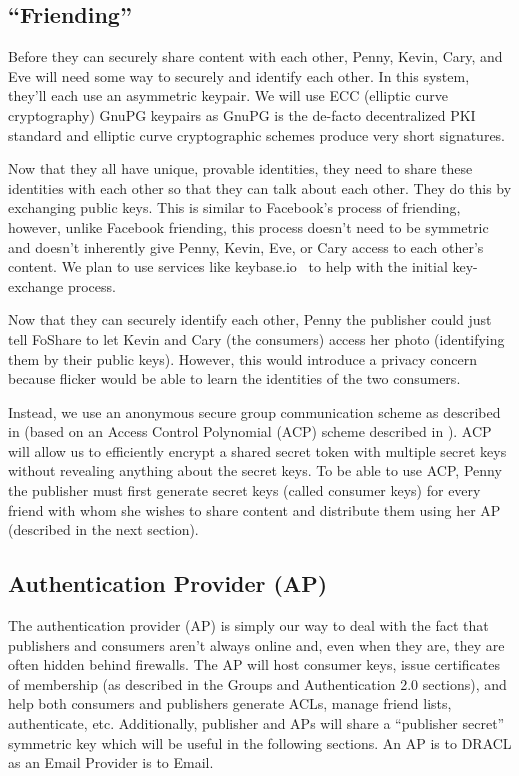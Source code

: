\documentclass[pdftex,12pt,a4papaer]{article}
\begin{document}
\subsection{``Friending''}

Before they can securely share content with each other, Penny, Kevin, Cary, and
Eve will need some way to securely and identify each other. In this system,
they'll each use an asymmetric keypair. We will use ECC (elliptic curve
cryptography) GnuPG keypairs as GnuPG is the de-facto decentralized PKI standard
and elliptic curve cryptographic schemes produce very short signatures.

Now that they all have unique, provable identities, they need to share these
identities with each other so that they can talk about each other. They do this
by exchanging public keys. This is similar to Facebook's process of friending,
however, unlike Facebook friending, this process doesn't need to be symmetric
and doesn't inherently give Penny, Kevin, Eve, or Cary access to each other's
content.  We plan to use services like keybase.io~\cite{keybase} to help with
the initial key-exchange process.

Now that they can securely identify each other, Penny the publisher could just
tell FoShare to let Kevin and Cary (the consumers) access her photo
(identifying them by their public keys). However, this would introduce a privacy
concern because flicker would be able to learn the identities of the two
consumers.

Instead, we use an anonymous secure group communication scheme as described in
\cite{acp2} (based on an Access Control Polynomial (ACP) scheme described in
\cite{acp}). ACP will allow us to efficiently encrypt a shared secret token with
multiple secret keys without revealing anything about the secret keys. To be
able to use ACP, Penny the publisher must first generate secret keys (called
consumer keys) for every friend with whom she wishes to share content and
distribute them using her AP (described in the next section).

\subsection{Authentication Provider (AP)}

The authentication provider (AP) is simply our way to deal with the fact that
publishers and consumers aren't always online and, even when they are, they are
often hidden behind firewalls. The AP will host consumer keys, issue
certificates of membership (as described in the Groups and Authentication 2.0
sections), and help both consumers and publishers generate ACLs, manage friend
lists, authenticate, etc. Additionally, publisher and APs will share a
``publisher secret'' symmetric key which will be useful in the following
sections. An AP is to DRACL as an Email Provider is to Email.
\end{document}
